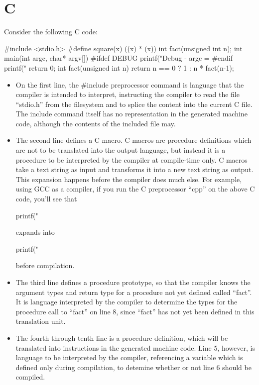  \section{C}
Consider the following C code:

 \begin{code}
#include <stdio.h>
#define square(x) ((x) * (x))
int fact(unsigned int n);
int main(int argc, char* argv[]){
#ifdef DEBUG
  printf("Debug - argc = %
#endif
 printf("%
  return 0;
}
int fact(unsigned int n){
  return n == 0
    ? 1
    : n * fact(n-1);
}
 \end{code}

 \begin{itemize}
  \item
     On the first line, the \#include preprocessor command
     is language that the compiler
     is intended to interpret, instructing the compiler to
     read the file ``stdio.h''
     from the filesystem and to splice the content
     into the current C file.  The include command
     itself has no representation in the generated machine code, although the contents
     of the included file may.

  \item
     The second line defines a C macro. C macros are procedure definitions which
      are not to be translated into the output language, but instead it is a procedure
     to be interpreted by the compiler
     at compile-time only.  C macros take a text
     string as input and transforms it into a new text string as output.
     This expansion happens before the compiler does much
     else.  For example, using GCC as a compiler, if you run the C preprocessor
     ``cpp'' on the above C code, you'll see that

     \begin{code}
  printf("%
     \end{code}

     \noindent expands into

     \begin{code}
  printf("%
     \end{code}

     \noindent before compilation.

  \item
     The third line defines a procedure prototype, so that
     the compiler knows the argument types and return type for a procedure not
     yet defined called ``fact''.
     It is language interpreted by the compiler to determine the types for the procedure
     call to ``fact'' on line 8, since ``fact'' has not yet been defined in this
     translation unit.
  \item
     The fourth through tenth line is a procedure definition, which will be
     translated into instructions in the generated machine code.  Line 5, however, is language
     to be interpreted by the compiler, referencing a variable which is defined
     only during compilation, to detemine whether or not line 6 should be
     compiled.
 \end{itemize}

